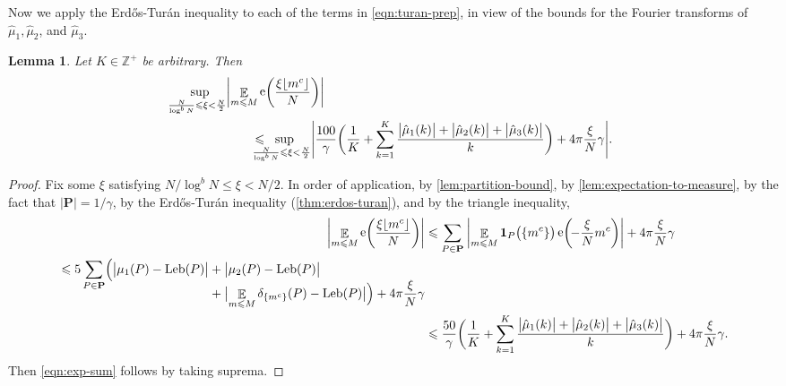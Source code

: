 \documentclass[letterpaper, 12pt]{article}
\theoremstyle{plain}
\newtheorem{Lemma}[Theorem]{Lemma}
\theoremstyle{definition}
\theoremstyle{plain}
\theoremstyle{plain}
\numberwithin{equation}{section}
\newcommand{\Erdos}{Erd\H{o}s}
\newcommand{\Turan}{Tur{\'a}n}
\newcommand{\Z}{\mathbb{Z}}
\renewcommand{\leq}{\leqslant}
\newcommand{\E}{\mathbb{E}}
\newcommand{\1}{\textbf{1}}
\DeclarePairedDelimiter\floor{\lfloor}{\rfloor}
\DeclareMathOperator{\Leb}{Leb}
\DeclareMathOperator{\e}{e}
\begin{document}
Now we apply the \Erdos-\Turan{} inequality to each of the terms in \cref{eqn:turan-prep}, in view of the bounds for the Fourier transforms of $\hat{\mu}_1, \hat{\mu}_2$, and $\hat{\mu}_3$. 

\begin{Lemma}\label{lem:turan-bound}
    Let $K \in \Z^{+}$ be arbitrary. Then
    \begin{equation}\label{eqn:exp-sum}
        \begin{split}
            \sup_{\mkern-10mu \frac{N}{\log^b{N}} \leq \xi < \frac{N}{2}} &\biggl\lvert\mathop{\E}_{m \leq M} \e\biggl(\frac{\xi\floor{m^c}}{N} \biggr) \biggr\rvert\\
            &\qquad \leq \;\;\smashoperator[l]{\sup_{\mkern-10mu \frac{N}{\log^b{N}} \leq \xi < \frac{N}{2}}} \Biggl\lvert \frac{100}{\gamma} \biggl(\frac{1}{K} + \sum_{k = 1}^{K} \frac{\bigl\lvert \hat{\mu}_1(k) \bigr\rvert + \bigl\lvert \hat{\mu}_2(k) \bigr\rvert  + \bigl\lvert \hat{\mu}_3(k) \bigr\rvert}{k} \biggr) + 4\pi\frac{\xi}{N} \gamma \Biggr\rvert.
        \end{split}
    \end{equation}
\end{Lemma}
\begin{proof}
    Fix some $\xi$ satisfying $N/\log^b{N} \leq \xi < N/2$. In order of application, by \cref{lem:partition-bound}, by \cref{lem:expectation-to-measure}, by the fact that $\lvert \textbf{P}\rvert = 1/\gamma$, by the \Erdos-\Turan{} inequality (\cref{thm:erdos-turan}), and by the triangle inequality,
    \begin{align*}
        \biggl\lvert\mathop{\E}_{m \leq M} \e\biggl(\frac{\xi\floor{m^c}}{N} \biggr) \biggr\rvert 
        &\leq \sum_{P \in \textbf{P}}\: \biggl\lvert \mathop{\E}_{m \leq M} \1_{P}\bigl(\{m^c\}\bigr) \e\biggl(\! -\frac{\xi}{N} m^c \biggr) \biggr\rvert + 4\pi\frac{\xi}{N} \gamma\\
        \begin{split}
            &\leq 5\sum_{P \in \textbf{P}} \Bigl(\bigl\lvert \mu_1(P) - \Leb(P)\bigr\rvert + \bigl\lvert \mu_2(P) - \Leb(P) \bigr\rvert\\[-1.2em]
            &\hphantom{\leq 5\sum_{P \in \textbf{P}} \Bigl(\bigl\lvert\mu_1(P) - \Leb(P)\bigr\rvert}\;
            + \bigl\lvert \mathop{\E}_{m \leq M} \delta_{\{m^c\}}(P) - \Leb(P) \bigr\rvert \Bigr) + 4\pi\frac{\xi}{N}\gamma
        \end{split}\\ 
        &\leq \frac{50}{\gamma}\biggl(\frac{1}{K} + \sum_{k = 1}^{K} \frac{\bigl\lvert \hat{\mu}_1(k) \bigr\rvert + \bigl\lvert \hat{\mu}_2(k) \bigr\rvert  + \bigl\lvert \hat{\mu}_3(k) \bigr\rvert}{k} \biggr) + 4\pi\frac{\xi}{N} \gamma.
    \end{align*} 
    Then \cref{eqn:exp-sum} follows by taking suprema. 
\end{proof}
\end{document}
